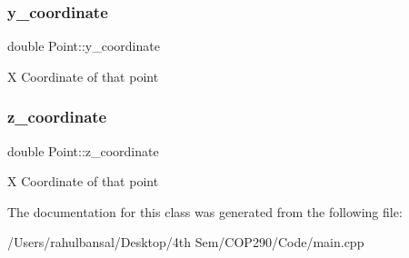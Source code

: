 \subsubsection{y\+\_\+coordinate}
{\footnotesize\ttfamily double Point\+::y\+\_\+coordinate}

X Coordinate of that point \mbox{\label{class_point_ad2efce027b01c3a91754c586c320ccfb}} 
\subsubsection{z\+\_\+coordinate}
{\footnotesize\ttfamily double Point\+::z\+\_\+coordinate}

X Coordinate of that point 

The documentation for this class was generated from the following file\+:\begin{DoxyCompactItemize}
\item 
/\+Users/rahulbansal/\+Desktop/4th Sem/\+C\+O\+P290/\+Code/main.\+cpp\end{DoxyCompactItemize}
